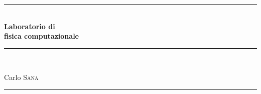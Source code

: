 \newcommand{\HRule}{\rule{\linewidth}{0.5mm}}
\begin{titlepage}
 \begin{center}
  \HRule \\[0.4cm]
{ \huge \bfseries Laboratorio di \\
fisica computazionale}\\[0.4cm]
\HRule \\[1cm]
\begin{flushleft} \Large
Carlo \textsc{Sana}
\end{flushleft}
\HRule \\[1cm]

\end{center}

\end{titlepage}
